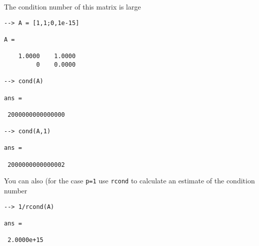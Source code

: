The condition number of this matrix is large
\begin{verbatim}
--> A = [1,1;0,1e-15]

A = 

    1.0000    1.0000 
         0    0.0000 

--> cond(A)

ans = 

 2000000000000000 

--> cond(A,1)

ans = 

 2000000000000002 
\end{verbatim}
You can also (for the case \verb|p=1| use \verb|rcond| to calculate an estimate
of the condition number
\begin{verbatim}
--> 1/rcond(A)

ans = 

 2.0000e+15 
\end{verbatim}
